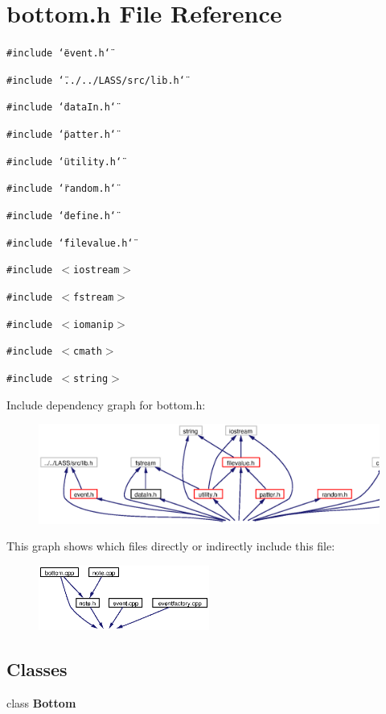 \section{bottom.h File Reference}
\label{bottom_8h}
{\tt \#include \char`\"{}event.h\char`\"{}}\par
{\tt \#include \char`\"{}../../LASS/src/lib.h\char`\"{}}\par
{\tt \#include \char`\"{}data\-In.h\char`\"{}}\par
{\tt \#include \char`\"{}patter.h\char`\"{}}\par
{\tt \#include \char`\"{}utility.h\char`\"{}}\par
{\tt \#include \char`\"{}random.h\char`\"{}}\par
{\tt \#include \char`\"{}define.h\char`\"{}}\par
{\tt \#include \char`\"{}filevalue.h\char`\"{}}\par
{\tt \#include $<$iostream$>$}\par
{\tt \#include $<$fstream$>$}\par
{\tt \#include $<$iomanip$>$}\par
{\tt \#include $<$cmath$>$}\par
{\tt \#include $<$string$>$}\par


Include dependency graph for bottom.h:\begin{figure}[H]
\begin{center}
\leavevmode
\includegraphics[width=361pt]{bottom_8h__incl}
\end{center}
\end{figure}


This graph shows which files directly or indirectly include this file:\begin{figure}[H]
\begin{center}
\leavevmode
\includegraphics[width=159pt]{bottom_8h__dep__incl}
\end{center}
\end{figure}
\subsection*{Classes}
\begin{CompactItemize}
\item 
class {\bf Bottom}
\end{CompactItemize}
